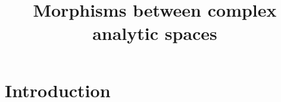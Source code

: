 






\title{Morphisms between complex analytic spaces}







\maketitle


\tableofcontents



\section{Introduction}\label{sec-introduction-morphisms}

\cite{stacks-project}

\printbibliography
